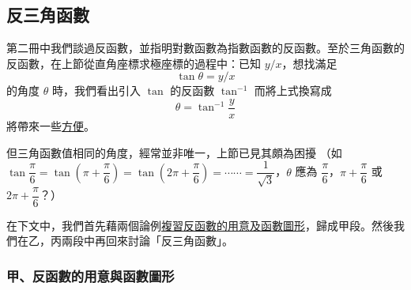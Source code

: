 \subsection{反三角函數}\label{sec:b5-1-2}

第二冊中我們談過反函數，並指明對數函數為指數函數的反函數。至於三角函數的反函數，在上節從直角座標求極座標的過程中：已知 $y/x$，想找滿足
\[
\tan \theta = y/x
\]
的角度 $\theta$ 時，我們看出引入 $\tan$ 的反函數 $\tan^{-1}$ 而將上式換寫成
\[
\theta = \tan^{-1} \frac{y}{x}
\]
將帶來一些\underline{方便}。

但三角函數值相同的角度，經常並非唯一，上節已見其頗為困擾
（如 $\tan \dfrac{\pi}{6} = \tan\left(\pi + \dfrac{\pi}{6}\right) = \tan\left(2\pi + \dfrac{\pi}{6}\right) = \cdots\cdots = \dfrac{1}{\sqrt{3}}$，$\theta$ 應為 $\dfrac{\pi}{6}$，$\pi + \dfrac{\pi}{6}$ 或 $2\pi + \dfrac{\pi}{6}$？）

在下文中，我們首先藉兩個論例\underline{複習反函數的用意及函數圖形}，歸成甲段。然後我們在乙，丙兩段中再回來討論「反三角函數」。

\subsubsection*{甲、反函數的用意與函數圖形}

